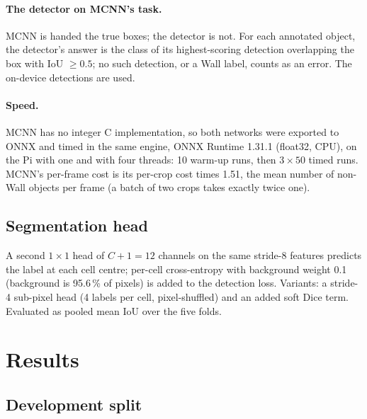 \documentclass[11pt,a4paper]{article}
\begin{document}
\paragraph{The detector on MCNN's task.} MCNN is handed the true boxes; the
detector is not. For each annotated object, the detector's answer is the
class of its highest-scoring detection overlapping the box with IoU $\ge
0.5$; no such detection, or a Wall label, counts as an error. The on-device
detections are used.

\paragraph{Speed.} MCNN has no integer C implementation, so both networks
were exported to ONNX and timed in the same engine, ONNX Runtime 1.31.1
(float32, CPU), on the Pi with one and with four threads: 10 warm-up runs,
then $3 \times 50$ timed runs. MCNN's per-frame cost is its per-crop cost
times 1.51, the mean number of non-Wall objects per frame (a batch of two
crops takes exactly twice one).

\subsection{Segmentation head}

A second $1 \times 1$ head of $C + 1 = 12$ channels on the same stride-8
features predicts the label at each cell centre; per-cell cross-entropy
with background weight 0.1 (background is 95.6\,\% of pixels) is added to the
detection loss. Variants: a stride-4 sub-pixel head (4 labels per cell,
pixel-shuffled) and an added soft Dice term. Evaluated as pooled mean IoU
over the five folds.

\section{Results}

\subsection{Development split}
\end{document}

